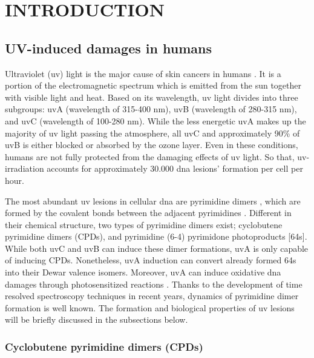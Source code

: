 \setlength{\parindent}{0pt}
\chapter{\bf INTRODUCTION}

\section{UV-induced damages in humans}

Ultraviolet (\gls{uv}) light is the major cause of skin cancers in humans \citep{kiefer2007effects}. It is a portion of the electromagnetic spectrum which is emitted from the sun together with visible light and heat. Based on its wavelength, \gls{uv} light divides into three subgroups: \gls{uv}A (wavelength of 315-400 nm), \gls{uv}B (wavelength of 280-315 nm), and \gls{uv}C (wavelength of 100-280 nm). While the less energetic \gls{uv}A makes up the majority of \gls{uv} light passing the atmosphere, all \gls{uv}C and approximately 90\% of \gls{uv}B is either blocked or absorbed by the ozone layer. Even in these conditions, humans are not fully protected from the damaging effects of \gls{uv} light. So that, \gls{uv}-irradiation accounts for approximately 30.000 \gls{dna} lesions’ formation per cell per hour.

The most abundant \gls{uv} lesions in cellular \gls{dna} are pyrimidine dimers \citep{kielbassa1997wavelength}, which are formed by the covalent bonds between the adjacent pyrimidines \citep{whitmore2001effect}. Different in their chemical structure, two types of pyrimidine dimers exist; cyclobutene pyrimidine dimers (\gls{CPD}s), and pyrimidine (6-4) pyrimidone photoproducts [\gls{64}s]. While both \gls{uv}C and \gls{uv}B can induce these dimer formations, \gls{uv}A is only capable of inducing \gls{CPD}s. Nonetheless, \gls{uv}A induction can convert already formed \gls{64}s into their Dewar valence isomers. Moreover, \gls{uv}A can induce oxidative \gls{dna} damages through photosensitized reactions \citep{hu2017cartography}. Thanks to the development of time resolved spectroscopy techniques in recent years, dynamics of pyrimidine dimer formation is well known. The formation and biological properties of \gls{uv} lesions will be briefly discussed in the subsections below.   

\subsection{Cyclobutene pyrimidine dimers (CPDs)} 

